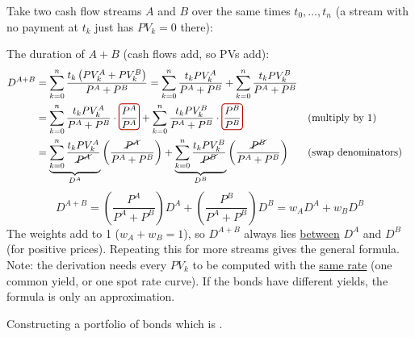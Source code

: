 Take two cash flow streams $A$ and $B$ over the same times $t_0, \dots, t_n$ (a stream with no payment at $t_k$ just has $PV_k = 0$ there):
\begin{center}
\end{center}
The duration of $A + B$ (cash flows add, so PVs add):
\begin{align*}
    D^{A+B} &= \sum_{k=0}^{n}\frac{t_k\left(PV_k^A + PV_k^B\right)}{P^A + P^B}
    = \sum_{k=0}^{n}\frac{t_kPV_k^A}{P^A + P^B} + \sum_{k=0}^{n}\frac{t_kPV_k^B}{P^A + P^B}\\
    &= \sum_{k=0}^{n}\frac{t_kPV_k^A}{P^A + P^B}\cdot\emphbox{\frac{P^A}{P^A}} + \sum_{k=0}^{n}\frac{t_kPV_k^B}{P^A + P^B}\cdot\emphbox{\frac{P^B}{P^B}} && \text{(multiply by 1)}\\
    &= \underbrace{\sum_{k=0}^{n}\frac{t_kPV_k^A}{\cancel{P^A}}}_{D^A}\left(\frac{\cancel{P^A}}{P^A + P^B}\right) + \underbrace{\sum_{k=0}^{n}\frac{t_kPV_k^B}{\cancel{P^B}}}_{D^B}\left(\frac{\cancel{P^B}}{P^A + P^B}\right) && \text{(swap denominators)}
\end{align*}
\[\boxed{D^{A+B} = \left(\frac{P^A}{P^A + P^B}\right)D^A + \left(\frac{P^B}{P^A + P^B}\right)D^B = w_AD^A + w_BD^B}\]
The weights add to 1 ($w_A + w_B = 1$), so $D^{A+B}$ always lies \ul{between} $D^A$ and $D^B$ (for positive prices). Repeating this for more streams gives the general formula.
\\Note: the derivation needs every $PV_k$ to be computed with the \ul{same rate} (one common yield, or one spot rate curve). If the bonds have different yields, the formula is only an approximation.

\begin{definition}[\rb{Immunization}]
    Constructing a portfolio of bonds which is .
\end{definition}

